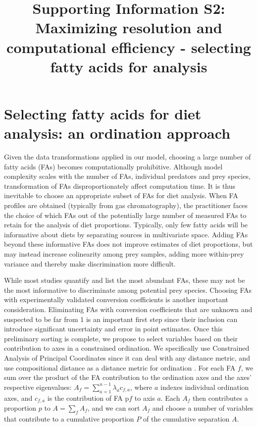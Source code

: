 \documentclass[12pt]{article}
\begin{document}
\title{Supporting Information S2: Maximizing resolution and computational efficiency - selecting fatty acids for analysis}
\maketitle

\section{Selecting fatty acids for diet analysis: an ordination approach}
Given the data transformations applied in our model, choosing a large
number of fatty acids (FAs) becomes computationally
prohibitive. Although model complexity scales with the number of FAs,
individual predators and prey species, transformation of FAs disproportionately affect computation time. It is thus inevitable to
choose an appropriate subset of FAs for diet analysis. When FA
profiles are obtained (typically from gas chromatography), the
practitioner faces the choice of which FAs out of the potentially
large number of measured FAs to retain for the analysis of diet
proportions. Typically, only few fatty acids will be informative about diets by separating sources in multivariate space. Adding FAs beyond these informative FAs does not improve estimates of diet proportions, but may instead increase colinearity among prey samples, adding more within-prey variance and thereby make discrimination more difficult.

While most studies quantify and list the most abundant FAs, these may
not be the most informative to discriminate among potential prey
species. Choosing FAs with experimentally validated conversion
coefficients is another important consideration. Eliminating FAs with
conversion coefficients that are unknown and suspected to be far from
1 is an important first step since their inclusion can introduce
significant uncertainty and error in point estimates. Once this
preliminary sorting is complete, we propose to select variables based
on their contribution to axes in a constrained ordination. We
specifically use Constrained Analysis of Principal Coordinates
\citep{anderson_canonical_2003} since it can deal with any distance
metric, and use compositional distance as a distance metric for
ordination \cite{aitchison_logratio_2000}. For each FA $f$, we sum over
the product of the FA contribution to the ordination axes and the
axes’ respective eigenvalues: $A_f = \sum_{a=1}^{n-1} \lambda_a
c_{f,a}$, where $a$ indexes individual ordination axes, and $c_{f,a}$ is the
contribution of FA p$f$ to axis $a$. Each $A_f$ then contributes a
proportion $p$ to $A=\sum_f A_f$, and we can sort $A_f$ and choose a
number of variables that contribute to a cumulative proportion $P$ of the
cumulative separation $A$.
\end{document}
